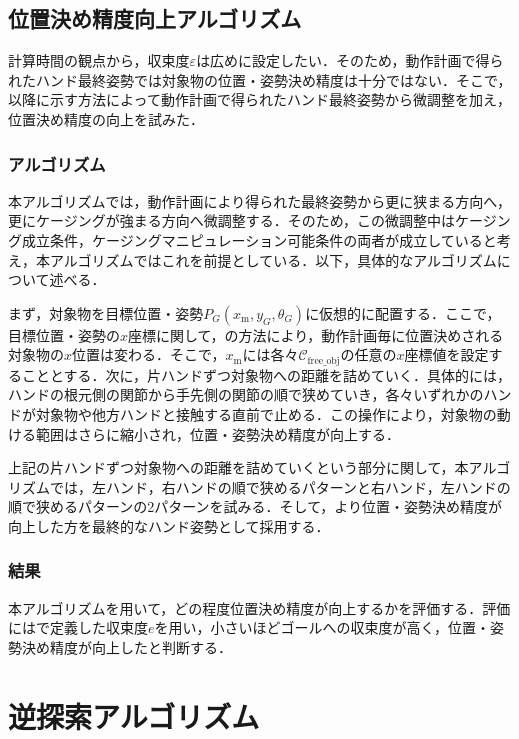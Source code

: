 \documentclass[a4paper,twoside,12pt,papersize, dvipdfmx]{iirthesis}
\begin{document}
\subsection{位置決め精度向上アルゴリズム}{\label{subsec::planner::formclosure}
計算時間の観点から，収束度$\varepsilon$は広めに設定したい．そのため，動作計画で得られたハンド最終姿勢では対象物の位置・姿勢決め精度は十分ではない．そこで，以降に示す方法によって動作計画で得られたハンド最終姿勢から微調整を加え，位置決め精度の向上を試みた．
\subsubsection{アルゴリズム}
本アルゴリズムでは，動作計画により得られた最終姿勢から更に狭まる方向へ，更にケージングが強まる方向へ微調整する．そのため，この微調整中はケージング成立条件，ケージングマニピュレーション可能条件の両者が成立していると考え，本アルゴリズムではこれを前提としている．以下，具体的なアルゴリズムについて述べる．\par
まず，対象物を目標位置・姿勢$P_G (x_{\mathrm m}, y_G, \theta_G)$に仮想的に配置する．ここで，目標位置・姿勢の$x$座標に関して，の方法により，動作計画毎に位置決めされる対象物の$x$位置は変わる．そこで，$x_{\mathrm m}$には各々$\mathcal{C}_{\mathrm{free\_obj}}$の任意の$x$座標値を設定することとする．次に，片ハンドずつ対象物への距離を詰めていく．具体的には，ハンドの根元側の関節から手先側の関節の順で狭めていき，各々いずれかのハンドが対象物や他方ハンドと接触する直前で止める．この操作により，対象物の動ける範囲はさらに縮小され，位置・姿勢決め精度が向上する．\par
上記の片ハンドずつ対象物への距離を詰めていくという部分に関して，本アルゴリズムでは，左ハンド，右ハンドの順で狭めるパターンと右ハンド，左ハンドの順で狭めるパターンの2パターンを試みる．そして，より位置・姿勢決め精度が向上した方を最終的なハンド姿勢として採用する．

\subsubsection{結果}
本アルゴリズムを用いて，どの程度位置決め精度が向上するかを評価する．評価にはで定義した収束度$e$を用い，小さいほどゴールへの収束度が高く，位置・姿勢決め精度が向上したと判断する．


\section{逆探索アルゴリズム}\label{sec::planner::reverse}
}
\end{document}
